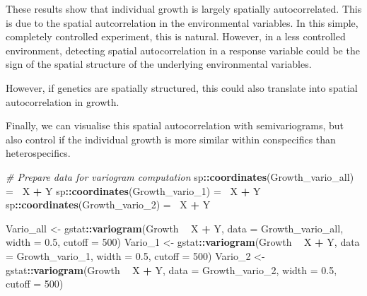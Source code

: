 \documentclass[
]{article}
\newenvironment{Shaded}{\begin{snugshade}}{\end{snugshade}}
\newcommand{\CommentTok}[1]{\textcolor[rgb]{0.56,0.35,0.01}{\textit{#1}}}
\newcommand{\DataTypeTok}[1]{\textcolor[rgb]{0.13,0.29,0.53}{#1}}
\newcommand{\DecValTok}[1]{\textcolor[rgb]{0.00,0.00,0.81}{#1}}
\newcommand{\ErrorTok}[1]{\textcolor[rgb]{0.64,0.00,0.00}{\textbf{#1}}}
\newcommand{\FloatTok}[1]{\textcolor[rgb]{0.00,0.00,0.81}{#1}}
\newcommand{\KeywordTok}[1]{\textcolor[rgb]{0.13,0.29,0.53}{\textbf{#1}}}
\newcommand{\NormalTok}[1]{#1}
\newcommand{\OperatorTok}[1]{\textcolor[rgb]{0.81,0.36,0.00}{\textbf{#1}}}
\newcommand{\StringTok}[1]{\textcolor[rgb]{0.31,0.60,0.02}{#1}}
\begin{document}
These results show that individual growth is largely spatially
autocorrelated. This is due to the spatial autcorrelation in the
environmental variables. In this simple, completely controlled
experiment, this is natural. However, in a less controlled environment,
detecting spatial autocorrelation in a response variable could be the
sign of the spatial structure of the underlying environmental variables.

However, if genetics are spatially structured, this could also translate
into spatial autocorrelation in growth.

Finally, we can visualise this spatial autocorrelation with
semivariograms, but also control if the individual growth is more
similar within conspecifics than heterospecifics.

\begin{Shaded}
\begin{Highlighting}[]
\CommentTok{# Prepare data for variogram computation}
\NormalTok{sp}\OperatorTok{::}\KeywordTok{coordinates}\NormalTok{(Growth_vario_all) =}\StringTok{ }\ErrorTok{~}\NormalTok{X }\OperatorTok{+}\StringTok{ }\NormalTok{Y}
\NormalTok{sp}\OperatorTok{::}\KeywordTok{coordinates}\NormalTok{(Growth_vario_}\DecValTok{1}\NormalTok{) =}\StringTok{ }\ErrorTok{~}\NormalTok{X }\OperatorTok{+}\StringTok{ }\NormalTok{Y}
\NormalTok{sp}\OperatorTok{::}\KeywordTok{coordinates}\NormalTok{(Growth_vario_}\DecValTok{2}\NormalTok{) =}\StringTok{ }\ErrorTok{~}\NormalTok{X }\OperatorTok{+}\StringTok{ }\NormalTok{Y}

\NormalTok{Vario_all <-}\StringTok{ }\NormalTok{gstat}\OperatorTok{::}\KeywordTok{variogram}\NormalTok{(Growth }\OperatorTok{~}\StringTok{ }\NormalTok{X }\OperatorTok{+}\StringTok{ }\NormalTok{Y, }\DataTypeTok{data =}\NormalTok{ Growth_vario_all, }
    \DataTypeTok{width =} \FloatTok{0.5}\NormalTok{, }\DataTypeTok{cutoff =} \DecValTok{500}\NormalTok{)}
\NormalTok{Vario_}\DecValTok{1}\NormalTok{ <-}\StringTok{ }\NormalTok{gstat}\OperatorTok{::}\KeywordTok{variogram}\NormalTok{(Growth }\OperatorTok{~}\StringTok{ }\NormalTok{X }\OperatorTok{+}\StringTok{ }\NormalTok{Y, }\DataTypeTok{data =}\NormalTok{ Growth_vario_}\DecValTok{1}\NormalTok{, }
    \DataTypeTok{width =} \FloatTok{0.5}\NormalTok{, }\DataTypeTok{cutoff =} \DecValTok{500}\NormalTok{)}
\NormalTok{Vario_}\DecValTok{2}\NormalTok{ <-}\StringTok{ }\NormalTok{gstat}\OperatorTok{::}\KeywordTok{variogram}\NormalTok{(Growth }\OperatorTok{~}\StringTok{ }\NormalTok{X }\OperatorTok{+}\StringTok{ }\NormalTok{Y, }\DataTypeTok{data =}\NormalTok{ Growth_vario_}\DecValTok{2}\NormalTok{, }
    \DataTypeTok{width =} \FloatTok{0.5}\NormalTok{, }\DataTypeTok{cutoff =} \DecValTok{500}\NormalTok{)}


\end{Highlighting}
\end{Shaded}
\end{document}
